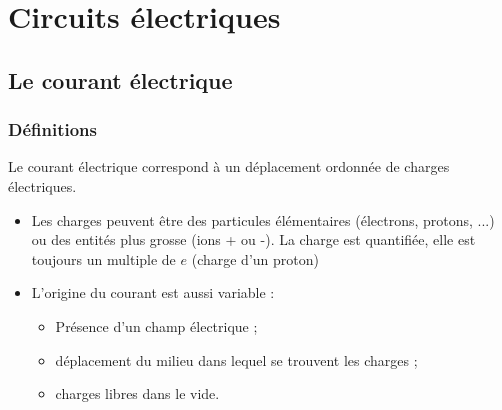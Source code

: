 \documentclass{cours}
\begin{document}
\setcounter{chapter}{1}
\chapter{Circuits électriques}
\section{Le courant électrique}
\subsection{Définitions}
Le courant électrique correspond à un déplacement ordonnée de charges électriques. 
\begin{itemize}
\item Les charges peuvent être des particules élémentaires (électrons, protons, ...) ou des entités plus grosse (ions + ou -). La charge est quantifiée, elle est toujours un multiple de $e$ (charge d'un proton)

\item L'origine du courant est aussi variable :
\begin{itemize}
\item Présence d'un champ électrique ;
\item déplacement du milieu dans lequel se trouvent les charges ;
\item charges libres dans le vide.
\end{itemize} 
\end{itemize}
\end{document}
